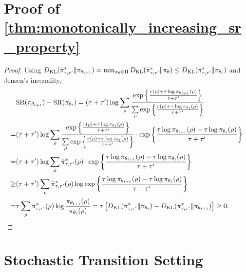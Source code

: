 \section{Proof of \cref{thm:monotonically_increasing_sr_property}}
\begin{proof}
	Using $D_{\mathrm{KL}}(\bar{\pi}_{\tau,\tau^{\prime}}^* \| \pi_{\theta_{t+1}}) = \min_{\pi_\theta \in \Pi}{ D_{\mathrm{KL}}(\bar{\pi}_{\tau,\tau^{\prime}}^* \| \pi_\theta)} \le D_{\mathrm{KL}}(\bar{\pi}_{\tau,\tau^{\prime}}^* \| \pi_{\theta_t})$ and Jensen's inequality,
	\begin{equation*}
	\begin{split}
	&\text{SR}(\pi_{\theta_{t+1}}) - \text{SR}(\pi_{\theta_t}) = (\tau + \tau^{\prime}) \log{ \sum\limits_{\rho}{ \frac{  \exp\left\{ \frac{r(\rho) + \tau \log{\pi_{\theta_{t+1}}(\rho)} }{\tau + \tau^{\prime}} \right\}  }{ \sum\limits_{\rho}{  \exp\left\{ \frac{r(\rho) + \tau \log{\pi_{\theta_t}(\rho)} }{\tau + \tau^{\prime}} \right\} } }  } } \\
	=& (\tau + \tau^{\prime}) \log{ \sum\limits_{\rho}{ \frac{  \exp\left\{ \frac{r(\rho) + \tau \log{\pi_{\theta_t}(\rho)} }{\tau + \tau^{\prime}} \right\}  }{ \sum\limits_{\rho}{  \exp\left\{ \frac{r(\rho) + \tau \log{\pi_{\theta_t}(\rho)} }{\tau + \tau^{\prime}} \right\} } }  } \cdot \exp\left\{ \frac{\tau \log{\pi_{\theta_{t+1}}(\rho)} - \tau \log{\pi_{\theta_t}(\rho)} }{\tau + \tau^{\prime}} \right\} } \\
	=& (\tau + \tau^{\prime}) \log{ \sum\limits_{\rho}{ \bar{\pi}_{\tau,\tau^{\prime}}^*(\rho) } \cdot \exp\left\{ \frac{\tau \log{\pi_{\theta_{t+1}}(\rho)} - \tau \log{\pi_{\theta_t}(\rho)} }{\tau + \tau^{\prime}} \right\} } \\
	\ge& (\tau + \tau^{\prime}) \sum\limits_{\rho}{ \bar{\pi}_{\tau,\tau^{\prime}}^*(\rho) \log{ \exp\left\{ \frac{\tau \log{\pi_{\theta_{t+1}}(\rho)} - \tau \log{\pi_{\theta_t}(\rho)} }{\tau + \tau^{\prime}} \right\} } } \\
	=& \tau \sum\limits_{\rho}{ \bar{\pi}_{\tau,\tau^{\prime}}^*(\rho) \log{ \frac{\pi_{\theta_{t+1}}(\rho)}{\pi_{\theta_t}(\rho)} } } = \tau \left[ D_{\mathrm{KL}}(\bar{\pi}_{\tau,\tau^{\prime}}^* \| \pi_{\theta_t}) - D_{\mathrm{KL}}(\bar{\pi}_{\tau,\tau^{\prime}}^* \| \pi_{\theta_{t+1}})\right] \ge 0. \qedhere
	\end{split}
	\end{equation*}
\end{proof}

\section{Stochastic Transition Setting}

